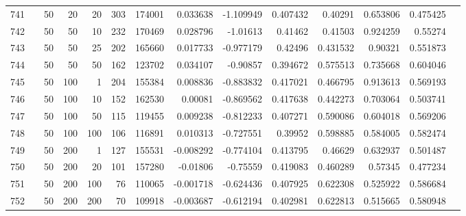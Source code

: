 \begin{longtable}{llrrrrrrrrrrrr}
		741 & &           50 &                20 &           20 &         303 &     174001 &  0.033638 & -1.109949 &  0.407432 &     0.40291 &       0.653806 &  0.475425 \\
		742 & &           50 &                50 &           10 &         232 &     170469 &  0.028796 &  -1.01613 &   0.41462 &     0.41503 &       0.924259 &   0.55274 \\
		743 & &           50 &                50 &           25 &         202 &     165660 &  0.017733 & -0.977179 &   0.42496 &    0.431532 &        0.90321 &  0.551873 \\
		744 & &           50 &                50 &           50 &         162 &     123702 &  0.034107 &  -0.90857 &  0.394672 &    0.575513 &       0.735668 &  0.604046 \\
		745 & &           50 &               100 &            1 &         204 &     155384 &  0.008836 & -0.883832 &  0.417021 &    0.466795 &       0.913613 &  0.569193 \\
		746 & &           50 &               100 &           10 &         152 &     162530 &   0.00081 & -0.869562 &  0.417638 &    0.442273 &       0.703064 &  0.503741 \\
		747 & &           50 &               100 &           50 &         115 &     119455 &  0.009238 & -0.812233 &  0.407271 &    0.590086 &       0.604018 &  0.569206 \\
		748 & &           50 &               100 &          100 &         106 &     116891 &  0.010313 & -0.727551 &   0.39952 &    0.598885 &       0.584005 &  0.582474 \\
		749 & &           50 &               200 &            1 &         127 &     155531 & -0.008292 & -0.774104 &  0.413795 &     0.46629 &       0.632937 &  0.501487 \\
		750 & &           50 &               200 &           20 &         101 &     157280 &  -0.01806 &  -0.75559 &  0.419083 &    0.460289 &        0.57345 &  0.477234 \\
		751 & &           50 &               200 &          100 &          76 &     110065 & -0.001718 & -0.624436 &  0.407925 &    0.622308 &       0.525922 &  0.586684 \\
		752 & &           50 &               200 &          200 &          70 &     109918 & -0.003687 & -0.612194 &  0.402981 &    0.622813 &       0.515665 &  0.580948 \\
	\end{longtable}
